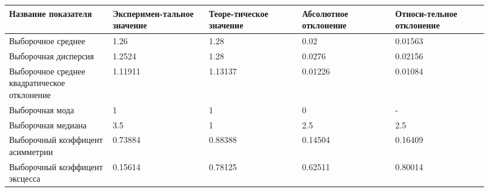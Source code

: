 \begin{center}
\begin{tabular}{|p{0.2\linewidth}|p{0.18\linewidth}|p{0.18\linewidth}|p{0.18\linewidth}|p{0.18\linewidth}|}\hline
Название показателя & Эксперимен{-}тальное значение & Теоре{-}тическое значение & Абсолютное отклонение & Относи{-}тельное отклонение\\\hline
Выборочное среднее & 1.26 & 1.28 & 0.02 & 0.01563 \\\hline
Выборочная дисперсия & 1.2524 & 1.28 & 0.0276 & 0.02156 \\\hline
Выборочное среднее\newline
квадратическое отклонение & 1.11911 & 1.13137 & 0.01226 & 0.01084 \\\hline
Выборочная мода & 1 & 1 & 0 & - \\\hline
Выборочная медиана & 3.5 & 1 & 2.5 & 2.5 \\\hline
Выборочный коэффицент асимметрии & 0.73884 & 0.88388 & 0.14504 & 0.16409 \\\hline
Выборочный коэффицент эксцесса & 0.15614 & 0.78125 & 0.62511 & 0.80014 \\\hline
\end{tabular}
\end{center}
